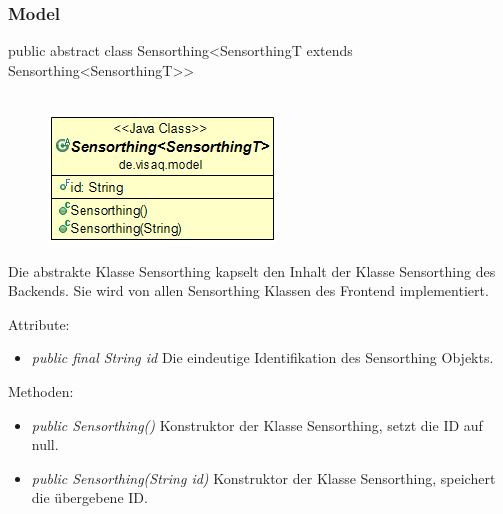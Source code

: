 \subsubsection{Model}


public abstract class Sensorthing<SensorthingT extends Sensorthing<SensorthingT>>
\\\\
\begin{minipage}{0.3\textwidth}
	\begin{figure}[H]
		\includegraphics[scale = 0.5
		]{media/frontend/model/SensorthingClass.png}
	\end{figure}
\end{minipage} \hfill
\begin{minipage}{0.6\textwidth}
	Die abstrakte Klasse Sensorthing kapselt den Inhalt der Klasse Sensorthing des Backends. Sie wird von allen Sensorthing Klassen des Frontend implementiert.
\end{minipage}

Attribute:
\begin{itemize}
	\item \emph{public final String id} Die eindeutige Identifikation des Sensorthing Objekts.
\end{itemize}
Methoden:
\begin{itemize}
	\item \emph{public Sensorthing()} Konstruktor der Klasse Sensorthing, setzt die ID auf null.
	\item \emph{public Sensorthing(String id)} Konstruktor der Klasse Sensorthing, speichert die übergebene ID.
\end{itemize}

